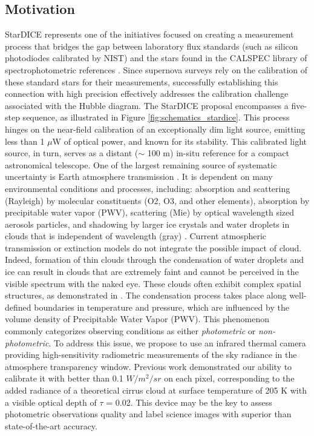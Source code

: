 \documentclass[amt, article]{copernicus}
\begin{document}
\subsection{Motivation}

StarDICE represents one of the initiatives focused on creating a measurement process that bridges the gap between laboratory flux standards (such as silicon photodiodes calibrated by NIST) and the stars found in the CALSPEC library of spectrophotometric references \citep{Bohlin2020}. Since supernova surveys rely on the calibration of these standard stars for their measurements, successfully establishing this connection with high precision effectively addresses the calibration challenge associated with the Hubble diagram. The StarDICE proposal encompasses a five-step sequence, as illustrated in Figure \ref{fig:schematics_stardice}. This process hinges on the near-field calibration of an exceptionally dim light source, emitting less than 1 $\mu$W of optical power, and known for its stability. This calibrated light source, in turn, serves as a distant ($\sim$ 100 m) in-situ reference for a compact astronomical telescope.
One of the largest remaining source of systematic uncertainty is Earth atmosphere transmission \citep{stubbs2012addressing, Stubbs2015, Li2016}. It is dependent on many environmental conditions and processes, including: absorption and scattering (Rayleigh) by molecular constituents (O2, O3, and other elements), absorption by precipitable water vapor (PWV), scattering (Mie) by optical wavelength sized aerosols particles, and shadowing by larger ice crystals and water droplets in clouds that is independent of wavelength (gray) \citep{Burke2010, Burke2017}. Current atmospheric transmission or extinction models do not integrate the possible impact of cloud. Indeed, formation of thin clouds through the condensation of water droplets and ice can result in clouds that are extremely faint and cannot be perceived in the visible spectrum with the naked eye. These clouds often exhibit complex spatial structures, as demonstrated in \citet{Burke2014}. The condensation process takes place along well-defined boundaries in temperature and pressure, which are influenced by the volume density of Precipitable Water Vapor (PWV). This phenomenon commonly categorizes observing conditions as either \textit{photometric} or \textit{non-photometric}.
To address this issue, we propose to use an infrared thermal camera providing high-sensitivity radiometric measurements of the sky radiance in the atmosphere transparency window. Previous work demonstrated our ability to calibrate it with better than 0.1 $W/m^{2}/sr$ on each pixel, corresponding to the added radiance of a theoretical cirrus cloud at surface temperature of 205 K with a visible optical depth of $\tau$ = 0.02. This device may be the key to assess photometric observations quality and label science images with superior than state-of-the-art accuracy.
\end{document}

